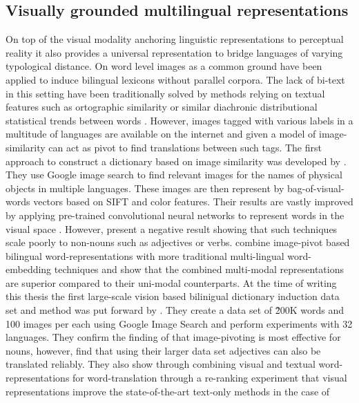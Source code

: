 \subsection{Visually grounded multilingual representations}
On top of the visual modality anchoring linguistic representations to perceptual reality it
also provides a universal representation to bridge languages of varying typological distance.
On word level images as a common ground have been applied to induce bilingual lexicons without parallel corpora.
The lack of bi-text in this setting have been traditionally solved by methods relying on textual features
such as ortographic similarity \cite{haghighi2008learning} or similar diachronic distributional
statistical trends between words \cite{schafer2002inducing}.
However, images tagged with various labels in a multitude of languages are available on the internet
and given a model of image-similarity can act as pivot to find translations between such tags.
The first approach to construct a dictionary based on image similarity was developed by \cite{bergsma2011learning}.
They use Google image search to find relevant images for the names of physical objects in multiple languages.
These images are then represent by bag-of-visual-words vectors based  on SIFT and color features.
Their results are vastly improved by applying pre-trained convolutional neural networks to represent words
in the visual space \cite{kiela2014improving}. However, \cite{hartmann2017limitations} present a negative result
showing that such techniques scale poorly to non-nouns such as adjectives or verbs.
\cite{vulic2016multi} combine image-pivot based bilingual word-representations with more traditional multi-lingual
word-embedding techniques and show that the combined multi-modal representations are superior compared to
their uni-modal counterparts. At the time of writing this thesis the first large-scale vision based bilinigual
dictionary induction data set and method was put forward by \cite{hewitt2018learning}. They create a data set
of \~200K words and 100 images per each using Google Image Search and perform experiments with 32 languages.
They confirm the finding of \cite{hartmann2017limitations} that image-pivoting is most effective for
nouns, however, find that using their larger data set adjectives can also be translated reliably. They also
show through combining visual and textual word-representations for word-translation through a re-ranking
experiment that visual representations improve the state-of-the-art text-only methods in the case of
